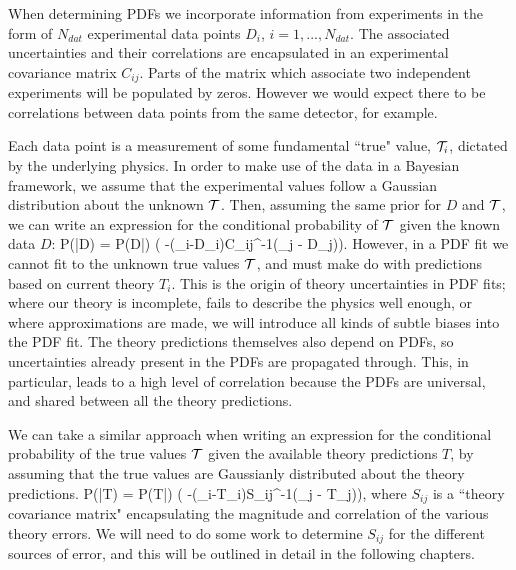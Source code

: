 When determining PDFs we incorporate information from experiments in the form of $N_{dat}$ experimental data points $D_i$, $i=1,...,N_{dat}$. The associated uncertainties and their correlations are encapsulated in an experimental covariance matrix $C_{ij}$. Parts of the matrix which associate two independent experiments will be populated by zeros. However we would expect there to be correlations between data points from the same detector, for example.

Each data point is a measurement of some fundamental ``true" value, $\mathcal{T}_i$, dictated by the underlying physics. In order to make use of the data in a Bayesian framework, we assume that the experimental values follow a Gaussian distribution about the unknown $\mathcal{T}$. Then, assuming the same prior for $D$ and $\mathcal{T}$, we can write an expression for the conditional probability of $\mathcal{T}$ given the known data $D$:
\beq
P(\truev|D) = P(D|\truev) \propto \exp\bigg( -(\truev_i-D_i)C_{ij}^{-1}(\truev_j - D_j)\bigg).
\eeq
However, in a PDF fit we cannot fit to the unknown true values $\mathcal{T}$, and must make do with predictions based on current theory $T_i$. This is the origin of theory uncertainties in PDF fits; where our theory is incomplete, fails to describe the physics well enough, or where approximations are made, we will introduce all kinds of subtle biases into the PDF fit. The theory predictions themselves also depend on PDFs, so uncertainties already present in the PDFs are propagated through. This, in particular, leads to a high level of correlation because the PDFs are universal, and shared between all the theory predictions. 

We can take a similar approach when writing an expression for the conditional probability of the true values $\mathcal{T}$ given the available theory predictions $T$, by assuming that the true values are Gaussianly distributed about the theory predictions.
\beq
P(\truev|T) = P(T|\truev) \propto \exp\bigg( -(\truev_i-T_i)S_{ij}^{-1}(\truev_j - T_j)\bigg),
\eeq
where $S_{ij}$ is a ``theory covariance matrix" encapsulating the magnitude and correlation of the various theory errors. We will need to do some work to determine $S_{ij}$ for the different sources of error, and this will be outlined in detail in the following chapters. 

